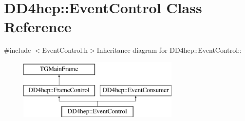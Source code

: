 \hypertarget{class_d_d4hep_1_1_event_control}{
\section{DD4hep::EventControl Class Reference}
\label{class_d_d4hep_1_1_event_control}
}


{\ttfamily \#include $<$EventControl.h$>$}Inheritance diagram for DD4hep::EventControl::\begin{figure}[H]
\begin{center}
\leavevmode
\includegraphics[height=3cm]{class_d_d4hep_1_1_event_control}
\end{center}
\end{figure}
